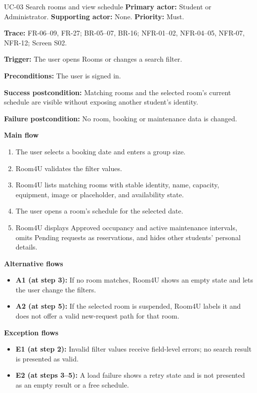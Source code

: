 \begin{usecasebox}{UC-03 Search rooms and view schedule}
\noindent\textbf{Primary actor:} Student or Administrator.\quad
\textbf{Supporting actor:} None.\quad
\textbf{Priority:} Must.\par
\textbf{Trace:} FR-06--09, FR-27; BR-05--07, BR-16; NFR-01--02, NFR-04--05, NFR-07, NFR-12; Screen S02.\par
\textbf{Trigger:} The user opens Rooms or changes a search filter.\par
\textbf{Preconditions:} The user is signed in.\par
\textbf{Success postcondition:} Matching rooms and the selected room's current schedule are visible without exposing another student's identity.\par
\textbf{Failure postcondition:} No room, booking or maintenance data is changed.\par
\textbf{Main flow}
\begin{enumerate}[label=\arabic*.,leftmargin=2em,itemsep=1pt,topsep=2pt]
  \item The user selects a booking date and enters a group size.
  \item Room4U validates the filter values.
  \item Room4U lists matching rooms with stable identity, name, capacity, equipment, image or placeholder, and availability state.
  \item The user opens a room's schedule for the selected date.
  \item Room4U displays Approved occupancy and active maintenance intervals, omits Pending requests as reservations, and hides other students' personal details.
\end{enumerate}
\textbf{Alternative flows}
\begin{itemize}[label={},leftmargin=0pt,itemsep=1pt,topsep=1pt]
  \item \textbf{A1 (at step 3):} If no room matches, Room4U shows an empty state and lets the user change the filters.
  \item \textbf{A2 (at step 5):} If the selected room is suspended, Room4U labels it and does not offer a valid new-request path for that room.
\end{itemize}
\textbf{Exception flows}
\begin{itemize}[label={},leftmargin=0pt,itemsep=1pt,topsep=1pt]
  \item \textbf{E1 (at step 2):} Invalid filter values receive field-level errors; no search result is presented as valid.
  \item \textbf{E2 (at steps 3--5):} A load failure shows a retry state and is not presented as an empty result or a free schedule.
\end{itemize}
\end{usecasebox}

